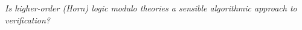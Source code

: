 \documentclass{beamer}
\begin{document}



\begin{frame}
  
  {\LARGE
    \color{lighterblue}
    \textit{Is higher-order (Horn) logic modulo theories a sensible
    \emph{algorithmic} approach to verification?}
  
  
}
  
\end{frame}
\end{document}
